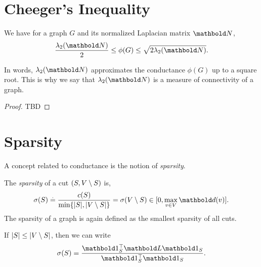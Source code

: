 
\section{Cheeger's Inequality}

\begin{thm} We have for a graph $G$ and its normalized Laplacian matrix $\mN$, \begin{align}
    \frac{\lambda_2(\mN)}{2} \leq \phi(G) \leq \sqrt{2 \lambda_2(\mN)}.
\end{align}
\end{thm}\noindent In words, $\lambda_2(\mN)$ approximates the conductance $\phi(G)$ up to a square root. This is why we say that $\lambda_2(\mN)$ is a measure of connectivity of a graph.

\begin{proof}
TBD
\end{proof}

\section{Sparsity}

A concept related to conductance is the notion of \emph{sparsity}.

\begin{defn}[Sparsity] The \emph{sparsity} of a cut $(S, V \setminus S)$ is, \begin{align}
    \sigma(\sS) \defeq \frac{c(\sS)}{\min\{|\sS|, |\sV \setminus \sS|\}} = \sigma(\sV \setminus \sS) \in [0, \max_{v \in \sV} \vd(v)].
\end{align} The sparsity of a graph is again defined as the smallest sparsity of all cuts.
\end{defn}
\begin{rmk}
If $|S| \leq |V \setminus S|$, then we can write \begin{align}
    \sigma(\sS) = \frac{\trans{\vOne_\sS}\mL\vOne_\sS}{\trans{\vOne_\sS}\vOne_\sS}.
\end{align}
\end{rmk}

